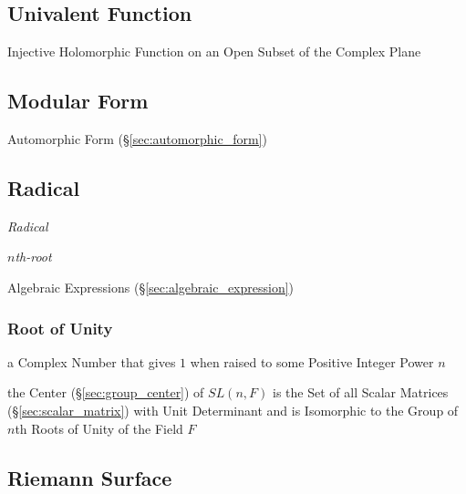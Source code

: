 \subsection{Univalent Function}\label{sec:univalent_function}

Injective Holomorphic Function on an Open Subset of the Complex Plane



\subsection{Modular Form}\label{sec:modular_form}

Automorphic Form (\S\ref{sec:automorphic_form})



\subsection{Radical}\label{sec:radical}

\emph{Radical}

\emph{$n$th-root}

Algebraic Expressions (\S\ref{sec:algebraic_expression})



\subsubsection{Root of Unity}\label{sec:unity_root}

a Complex Number that gives $1$ when raised to some Positive Integer Power $n$

the Center (\S\ref{sec:group_center}) of $SL(n,F)$ is the Set of all Scalar
Matrices (\S\ref{sec:scalar_matrix}) with Unit Determinant and is Isomorphic to
the Group of $n$th Roots of Unity of the Field $F$



\subsection{Riemann Surface}\label{sec:riemann_surface}

